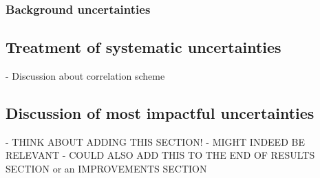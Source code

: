 \subsubsection{Background uncertainties}




\subsection{Treatment of systematic uncertainties}
- Discussion about correlation scheme


\subsection{Discussion of most impactful uncertainties}

- THINK ABOUT ADDING THIS SECTION!
- MIGHT INDEED BE RELEVANT 
- COULD ALSO ADD THIS TO THE END OF RESULTS SECTION or an IMPROVEMENTS SECTION
